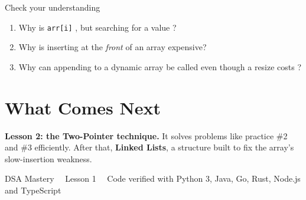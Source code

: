 \documentclass[11pt,a4paper]{article}
\begin{document}
\begin{callout}{Check your understanding}
\begin{enumerate}[leftmargin=1.4em,itemsep=3pt,topsep=0pt]
  \item Why is \texttt{arr[i]} , but searching for a value ?
  \item Why is inserting at the \emph{front} of an array expensive?
  \item Why can appending to a dynamic array be called  even though a resize costs ?
\end{enumerate}
\end{callout}

\section{What Comes Next}\label{s:next}

\textbf{Lesson 2: the Two-Pointer technique.} It solves problems like practice \#2 and \#3 efficiently.
After that, \textbf{Linked Lists}, a structure built to fix the array's slow-insertion weakness.

\vfill
\begin{center}
{\small\color{cmt}DSA Mastery \ \textperiodcentered\ Lesson 1 \ \textperiodcentered\ Code verified with Python 3, Java, Go, Rust, Node.js and TypeScript}
\end{center}
\end{document}
